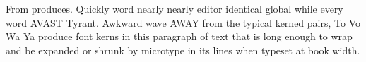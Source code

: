\documentclass[11pt]{book}
\begin{document}
From produces. Quickly word nearly nearly editor identical global while every
word AVAST Tyrant. Awkward wave AWAY from the typical kerned pairs, To Vo Wa Ya
produce font kerns in this paragraph of text that is long enough to wrap and
be expanded or shrunk by microtype in its lines when typeset at book width.
\end{document}
